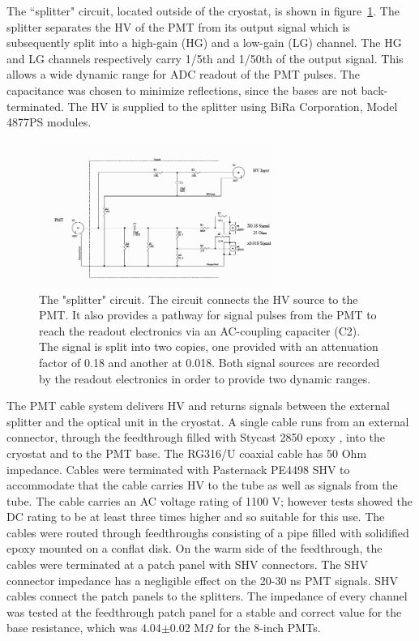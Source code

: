 The ``splitter" circuit, located outside of the cryostat, is shown in figure~\ref{fig:splitter}. The splitter separates the HV of the PMT from its output signal which is subsequently split into a high-gain (HG) and a low-gain (LG) channel. The HG and LG channels respectively carry 1/5th and 1/50th of the output signal.  This allows a wide dynamic range for ADC readout of the PMT pulses.  The capacitance was chosen to minimize reflections, since the bases are not back-terminated.  The HV is supplied to the splitter using BiRa Corporation, Model 4877PS modules.

\begin{figure}[h]
\centering 
\includegraphics[width=0.7\textwidth]{./light_figures/splitter_modified.png}
\caption{The "splitter" circuit.  The circuit connects the HV source to the PMT. It also provides a pathway for signal pulses from the PMT to reach the readout electronics via an AC-coupling capaciter (C2).  The signal is split into two copies, one provided with an attenuation factor of 0.18 and another at 0.018. Both signal sources are recorded by the readout electronics in order to provide two dynamic ranges.}
\label{fig:splitter}
\end{figure}


The PMT cable system delivers HV and returns signals between the external splitter and the optical unit in the cryostat.   A single cable runs from an external connector, through the feedthrough filled with Stycast 2850 epoxy \cite{Stycast}, into the cryostat and to the PMT base. The RG316/U coaxial cable has 50 Ohm impedance.  Cables were terminated with Pasternack PE4498 SHV to accommodate that the cable carries HV to the tube as well as signals from the tube.
The cable carries an AC voltage rating of 1100 V; however tests showed the DC rating to be at least three times higher and so suitable for this use.  The cables were routed through feedthroughs consisting of a pipe filled with solidified epoxy mounted on a conflat disk.  On the warm side of the feedthrough, the cables were terminated at a patch panel with SHV connectors. The SHV connector impedance has a negligible effect on the 20-30 ns PMT signals.  SHV cables connect the patch panels to the splitters.  The impedance of every channel was tested at the feedthrough patch panel for a stable and correct value for the base resistance, which was 4.04$\pm$0.02 M$\Omega$ for the 8-inch PMTs. 


